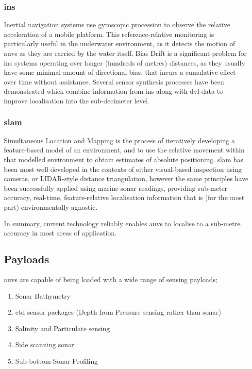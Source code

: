 \subsubsection{\gls{ins}}
Inertial navigation systems use gyroscopic procession to observe the relative acceleration of a mobile platform.
This reference-relative monitoring is particularly useful in the underwater environment, as it detects the motion of \glspl{auv} as they are carried by the water itself.
Bias Drift is a significant problem for \gls{ins} systems operating over longer (hundreds of metres) distances, as they usually have some minimal amount of directional bias, that incurs a cumulative effect over time without assistance.
Several sensor synthesis processes have been demonstrated which combine information from \gls{ins} along with \gls{dvl} data to improve localisation into the sub-decimeter level\cite{Jalving2003,Liu2014,Allotta2015}.
\subsubsection{\gls{slam}}
Simultaneous Location and Mapping is the process of iteratively developing a feature-based model of an environment, and to use the relative movement within that modelled environment to obtain estimates of absolute positioning.
\gls{slam} has been most well developed in the contexts of either visual-based inspection using cameras, or LIDAR-style distance triangulation, however the same principles have been successfully applied using marine sonar readings, providing sub-meter accuracy, real-time, feature-relative localisation information that is (for the most part) environmentally agnostic\cite{Williams2000}.


In summary, current technology reliably enables \glspl{auv} to localise to a sub-metre accuracy in most areas of application.

\subsection{Payloads}


\glspl{auv} are capable of being loaded with a wide range of sensing payloads;
\begin{enumerate}
	\item Sonar Bathymetry
	\item \gls{ctd} sensor packages (Depth from Pressure sensing rather than sonar)
	\item Salinity and Particulate sensing
	\item Side scanning sonar 
	\item Sub-bottom Sonar Profiling
\end{enumerate}

